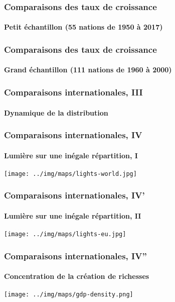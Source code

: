 \documentclass[10pt,notheorems]{beamer}
\theoremstyle{plain}
\theoremstyle{definition} %
\begin{document}
\begin{frame}
  \frametitle{Comparaisons des taux de croissance}
  \framesubtitle{Petit échantillon (55 nations de 1950 à 2017)}

  \begin{Center}
    
  \end{Center}

\end{frame}


\begin{frame}
  \frametitle{Comparaisons des taux de croissance}
  \framesubtitle{Grand échantillon (111 nations de 1960 à 2000)}

  \begin{Center}
    
  \end{Center}

\end{frame}


\begin{frame}
  \frametitle{Comparaisons internationales, III}
  \framesubtitle{Dynamique de la distribution}

  \begin{center}
    
  \end{center}

\end{frame}


\begin{frame}
  \frametitle{Comparaisons internationales, IV}
  \framesubtitle{Lumière sur une inégale répartition, I}

  \begin{center}
    \texttt{[image: ../img/maps/lights-world.jpg]}
  \end{center}

\end{frame}


\begin{frame}
  \frametitle{Comparaisons internationales, IV'}
  \framesubtitle{Lumière sur une inégale répartition, II}

  \begin{center}
    \texttt{[image: ../img/maps/lights-eu.jpg]}
  \end{center}

\end{frame}


\begin{frame}
  \frametitle{Comparaisons internationales, IV''}
  \framesubtitle{Concentration de la création de richesses}

  \begin{center}
    \texttt{[image: ../img/maps/gdp-density.png]}
  \end{center}

\end{frame}
\end{document}
